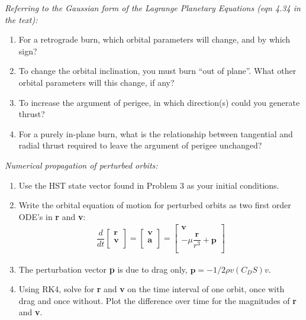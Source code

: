 \documentclass[onecolumn,10pt]{jhwhw}
\begin{document}
\clearpage
\problem{}
\textit{Referring to the Gaussian form of the Lagrange Planetary Equations (eqn 4.34 in the text):}
\begin{enumerate}
\item For a retrograde burn, which orbital parameters will change, and by which sign?
\item To change the orbital inclination, you must burn ``out of plane''. What other orbital parameters will this change, if any?
\item To increase the argument of perigee, in which direction(s) could you generate thrust?
\item For a purely in-plane burn, what is the relationship between tangential and radial thrust required to leave the argument of perigee unchanged?
\end{enumerate}

\clearpage
\problem{}
\textit{Numerical propagation of perturbed orbits:}
\begin{enumerate}
\item Use the HST state vector found in Problem 3 as your initial conditions.
\item Write the orbital equation of motion for perturbed orbits as two first order ODE’s in \textbf{r} and \textbf{v}:
\begin{align*}
\dfrac{d}{dt} \begin{bmatrix}
          \textbf{r} \\
          \textbf{v} \\
        \end{bmatrix}
  = \begin{bmatrix}
          \textbf{v} \\
          \textbf{a} \\
        \end{bmatrix}
  = \begin{bmatrix}
          \textbf{v} \\
          -\mu \dfrac{\textbf{r}}{r^3} + \textbf{p} \\
        \end{bmatrix}
\end{align*}
\item The perturbation vector \textbf{p} is due to drag only, $\textbf{p} = -1/2 \rho v(C_D S)v$.
\item Using RK4, solve for \textbf{r} and \textbf{v} on the time interval of one orbit, once with drag and once without. Plot the
difference over time for the magnitudes of \textbf{r} and \textbf{v}.
\end{enumerate}



% 
\end{document}
